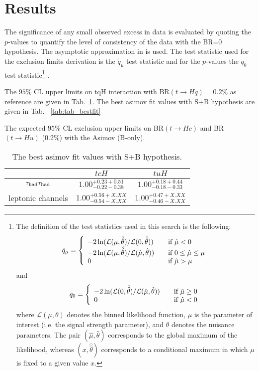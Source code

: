 \section{Results}
\label{sec:results}

The significance of any small observed excess in data is evaluated by quoting the $p$-values to quantify the level of consistency of the data with the BR=0 hypothesis. The asymptotic approximation in \cite{CCGV} is used. The test statistic used for the exclusion limits derivation is the $\tilde{q}_\mu$ test statistic
and for the $p$-values the $q_{0}$ test statistic\footnote{The definition of the test statistics used in this search is the following:
\[ \tilde q_\mu = \left\{
  \begin{array}{l l}
    -2 \ln (\mathcal{L}(\mu,\hat{\hat{\theta}})/\mathcal{L}(0,\hat{\hat\theta})) & \quad \text{if $\hat\mu < 0$}\\
    -2 \ln (\mathcal{L}(\mu,\hat{\hat{\theta}})/\mathcal{L}(\hat \mu,\hat\theta)) & \quad \text{if $0 \leq \hat\mu \leq \mu$}\\
    0 & \quad \text{if $\hat\mu > \mu$}
  \end{array} \right.\]
and
\[ q_0 = \left\{
  \begin{array}{l l}
    -2 \ln (\mathcal{L}(0,\hat{\hat{\theta}})/\mathcal{L}(\hat\mu,\hat\theta)) &\quad \text{if $\hat\mu \geq 0$}\\
    0 & \quad \text{if $\hat\mu <0$}
  \end{array} \right.\]
where $\mathcal L(\mu,\theta)$ denotes the binned likelihood function, $\mu$ is the parameter of interest (i.e.
the signal strength parameter), and $\theta$ denotes the nuisance parameters. The pair $(\hat\mu, \hat\theta)$
corresponds to the global maximum of the likelihood, whereas $(x, \hat{\hat\theta})$ corresponds to a conditional
maximum in which $\mu$ is fixed to a given value $x$.
}
\cite{CCGV}.

The $95\%$ CL upper limits on tqH interaction with BR$(t\to Hq)=0.2\%$ as reference are given in Tab.~\ref{tab:tab_limit}. The best asimov fit values with S+B hypothesis are given in Tab. ~\ref{tab:tab_bestfit}

\begin{table}[htb]
\caption{ The expected $95\%$ CL exclusion upper limits on BR$(t\to Hc)$ and BR$(t\to Hu)$ (0.2\%) with the Asimov (B-only).}

\label{tab:tab_limit}
\end{table}

\begin{table}[htb]
\caption{ The best asimov fit values with S+B hypothesis. }
\centering
\begin{tabular}{|c|c|c|} \hline
  & $tcH$ & $tuH$ \\ \hline
  $\tau_\text{had}{}\tau_\text{had}$ & $1.00^{+0.23 +0.51}_{-0.22 -0.38}$ & $1.00^{+0.18 +0.44}_{-0.18 -0.33}$ \\ \hline
  leptonic channels & $1.00^{+0.56 +X.XX}_{-0.54 -X.XX}$ & $1.00^{+0.47 +X.XX}_{-0.46 -X.XX}$ \\ \hline

\end{tabular}
\label{tab:tab_limit}
\end{table}

